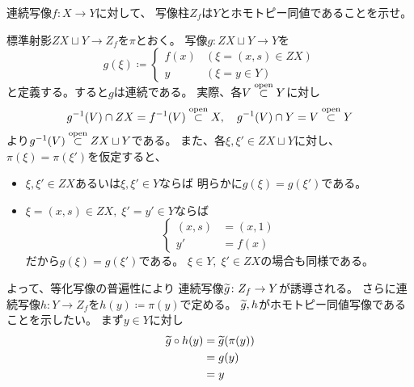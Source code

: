 \documentclass[report]{jlreq}
\begin{document}
\begin{problem}[幾何学II 3.4]
    連続写像$f \colon X \to Y$に対して、
    写像柱$Z_f$は$Y$とホモトピー同値であることを示せ。
\end{problem}

\begin{answer}
    標準射影$ZX \sqcup Y \to Z_f$を$\pi$とおく。
    写像$g \colon ZX \sqcup Y \to Y$を
    \begin{equation}
        g(\xi) \coloneqq \begin{cases}
            f(x) & (\xi = (x, s) \in ZX) \\
            y & (\xi = y \in Y)
        \end{cases}
    \end{equation}
    と定義する。すると$g$は連続である。
    実際、各$V \stackrel{\text{open}}{\subset} Y$に対し
    \begin{equation}
        g^{-1}(V) \cap ZX = f^{-1}(V) \stackrel{\text{open}}{\subset} X,
        \quad
        g^{-1}(V) \cap Y = V \stackrel{\text{open}}{\subset} Y
    \end{equation}
    より$g^{-1}(V) \stackrel{\text{open}}{\subset} ZX \sqcup Y$である。
    また、各$\xi, \xi' \in ZX \sqcup Y$に対し、
    $\pi(\xi) = \pi(\xi')$を仮定すると、
    \begin{itemize}
        \item $\xi, \xi' \in ZX$あるいは$\xi, \xi' \in Y$ならば
            明らかに$g(\xi) = g(\xi')$である。
        \item $\xi = (x, s) \in ZX,\; \xi' = y' \in Y$ならば
            \begin{equation}
                \begin{cases}
                    (x, s) &= (x, 1) \\
                    y' &= f(x)
                \end{cases}
            \end{equation}
            だから$g(\xi) = g(\xi')$である。
            $\xi \in Y,\; \xi' \in ZX$の場合も同様である。
    \end{itemize}
    よって、等化写像の普遍性により
    連続写像$\widetilde{g} \colon Z_f \to Y$が誘導される。
    さらに連続写像$h \colon Y \to Z_f$を$h(y) \coloneqq \pi(y)$で定める。
    $\widetilde{g}, h$がホモトピー同値写像であることを示したい。
    まず$y \in Y$に対し
    \begin{alignat}{1}
        \widetilde{g} \circ h(y)
            &= \widetilde{g}(\pi(y)) \\
            &= g(y) \\
            &= y
    \end{alignat}

\end{answer}
\end{document}
